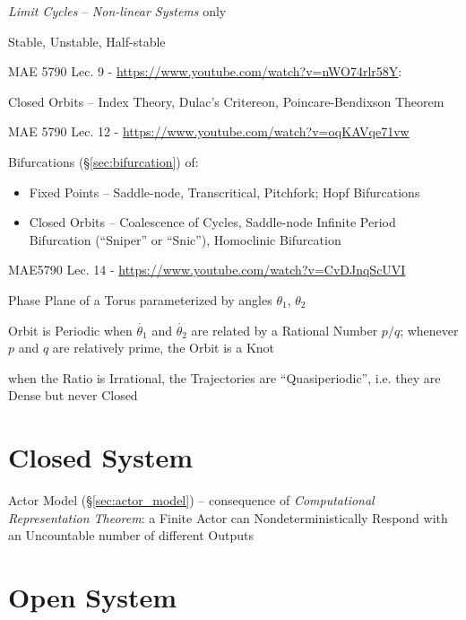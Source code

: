 \emph{Limit Cycles} -- \emph{Non-linear Systems} only

Stable, Unstable, Half-stable


MAE 5790 Lec. 9 - \url{https://www.youtube.com/watch?v=nWO74rlr58Y}:

Closed Orbits -- Index Theory, Dulac's Critereon, Poincare-Bendixson Theorem

MAE 5790 Lec. 12 - \url{https://www.youtube.com/watch?v=oqKAVqe71vw}

Bifurcations (\S\ref{sec:bifurcation}) of:
\begin{itemize}
  \item Fixed Points -- Saddle-node, Transcritical, Pitchfork; Hopf Bifurcations
  \item Closed Orbits -- Coalescence of Cycles,
    Saddle-node Infinite Period Bifurcation (``Sniper'' or ``Snic''),
    Homoclinic Bifurcation
\end{itemize}

MAE5790 Lec. 14 - \url{https://www.youtube.com/watch?v=CvDJnqScUVI}

Phase Plane of a Torus parameterized by angles $\theta_1$, $\theta_2$

Orbit is Periodic when $\dot{\theta_1}$ and $\dot{\theta_2}$ are related by a
Rational Number $p/q$; whenever $p$ and $q$ are relatively prime, the Orbit is a
Knot

when the Ratio is Irrational, the Trajectories are ``Quasiperiodic'', i.e. they
are Dense but never Closed



\section{Closed System}\label{sec:closed_system}


Actor Model (\S\ref{sec:actor_model}) -- consequence of \emph{Computational
  Representation Theorem}: a Finite Actor can Nondeterministically Respond with
an Uncountable number of different Outputs %



\section{Open System}\label{sec:open_system}

